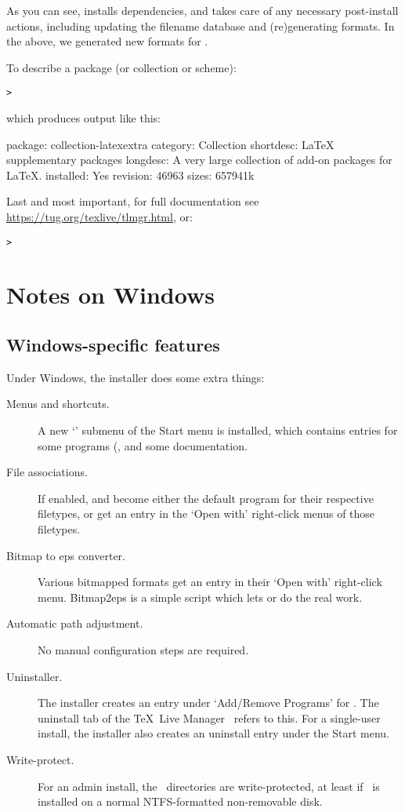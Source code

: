 \documentclass{article}
\begin{document}
As you can see,  installs dependencies, and takes care of any
necessary post-install actions, including updating the filename database
and (re)generating formats.  In the above, we generated new formats for
\XeTeX.

To describe a package (or collection or scheme):
\begin{alltt}
> 
\end{alltt}
which produces output like this:
\begin{fverbatim}
package:    collection-latexextra
category:   Collection
shortdesc:  LaTeX supplementary packages
longdesc:   A very large collection of add-on packages for LaTeX.
installed:  Yes
revision:   46963
sizes:      657941k
\end{fverbatim}

Last and most important, for full documentation see
\url{https://tug.org/texlive/tlmgr.html}, or:
\begin{alltt}
> 
\end{alltt}


\section{Notes on Windows}
\label{sec:windows}

\subsection{Windows-specific features}
\label{sec:winfeatures}

Under Windows, the installer does some extra things:
\begin{description}
\item[Menus and shortcuts.] A new `\TL{}' submenu of the
  Start menu is installed, which contains entries for some \GUI{}
  programs (,  and some documentation.
\item[File associations.] If enabled,  and 
  become either the default program for
  their respective filetypes, or get an entry in the `Open with'
  right-click menus of those filetypes.
\item[Bitmap to eps converter.] Various bitmapped formats get an
  entry  in their `Open with' right-click
  menu. Bitmap2eps is a simple script which lets  or
   do the real work.
\item[Automatic path adjustment.] No manual configuration steps are required.
\item[Uninstaller.] The installer creates an entry under `Add/Remove
  Programs' for \TL. The uninstall tab of the \TeX\ Live Manager \GUI\
  refers to this. For a single-user install, the installer also
  creates an uninstall entry under the Start menu.
\item[Write-protect.] For an admin install, the \TL\ directories are
  write-protected, at least if \TL\ is installed on a normal
  NTFS-formatted non-removable disk.
\end{description}
\end{document}
